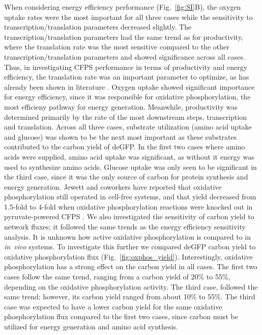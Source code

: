 \documentclass[journal=asbcd6,manuscript=article]{achemso}
\begin{document}
When considering energy efficiency performance (Fig.~\ref{fig:SI}B), the oxygen uptake rates were the most important for all three cases while the sensitivity to transcription/translation parameters decreased slightly.
The transcription/translation parameters had the same trend as for productivity, where the translation rate was the most sensitive compared to the other transcription/translation parameters and showed significance across all cases.
Thus, in investigating CFPS performance in terms of productivity and energy efficiency, the translation rate was an important parameter to optimize, as has already been shown in literature \cite{2005_underwood_biotech, 2014_li_PlosOne}.
Oxygen uptake showed significant importance for energy efficiency, since it was responsible for oxidative phosphorylation, the most efficieny pathway for energy generation.
Meanwhile, productivity was determined primarily by the rate of the most downstream steps, transcription and translation.
Across all three cases, substrate utilization (amino acid uptake and glucose) was shown to be the next most important as these substrates contributed to the carbon yield of deGFP.
In the first two cases where amino acids were supplied, amino acid uptake was significant, as without it energy was used to synthesize amino acids.
Glucose uptake was only seen to be significant in the third case, since it was the only source of carbon for protein synthesis and energy generation.
Jewett and coworkers have reported that oxidative phosphorylation still operated in cell-free systems, and that yield decreased from 1.5-fold to 4-fold when oxidative phosphorylation reactions were knocked out in pyruvate-powered CFPS \cite{Jewett:2008aa}.
We also investigated the sensitivity of carbon yield to network fluxes; it followed the same trends as the energy efficiency sensitivity analysis.
It is unknown how active oxidative phosphorylation is compared to in \textit{in~vivo} systems.
To investigate this further we compared deGFP carbon yield to oxidative phosphorylation flux (Fig.~\ref{fig:oxphos_yield}).
Interestingly, oxidative phosphorylation has a strong effect on the carbon yield in all cases.
The first two cases follow the same trend, ranging from a carbon yield of 20\% to 55\%, depending on the oxidative phosphorylation activity.
The third case, followed the same trend; however, its carbon yield ranged from about 10\% to 55\%.
The third case was expected to have a lower carbon yield for the same oxidative phosphorylation flux compared to the first two cases, since carbon must be utilized for energy generation and amino acid synthesis.
\end{document}
